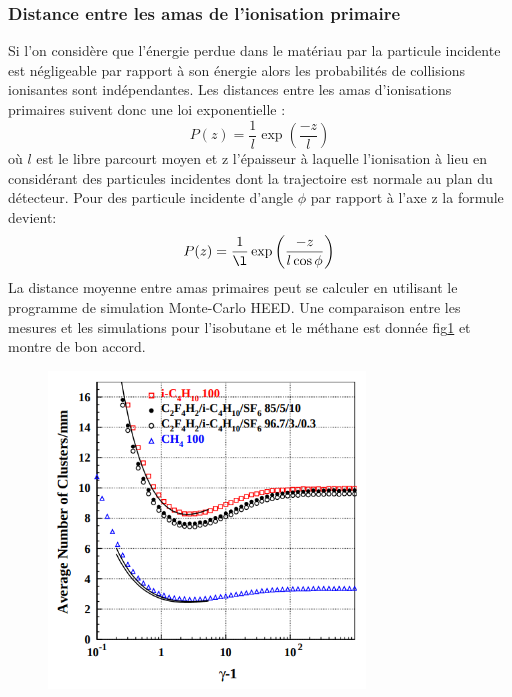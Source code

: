 \subsubsection{Distance entre les amas de l'ionisation primaire}
Si l'on considère que l'énergie perdue dans le matériau par la particule incidente est négligeable par rapport à son énergie alors les probabilités de collisions ionisantes sont indépendantes. Les distances entre les amas d'ionisations primaires suivent donc une loi exponentielle :
\begin{equation}
P(z)=\frac{1}{l}\exp\left(\frac{-z}{l}\right)
\end{equation} 
où $l$ est le libre parcourt moyen et z l'épaisseur à laquelle l'ionisation à lieu en considérant des particules incidentes dont la trajectoire est normale au plan du détecteur. Pour des particule incidente d'angle $\phi$ par rapport à l'axe z la formule devient:
\begin{equation}
P(z)=\frac{1}{\l}\exp\left(\frac{-z}{l\cos\phi}\right)
\end{equation}
La distance moyenne entre amas primaires peut se calculer en utilisant le programme de simulation Monte-Carlo HEED\cite{HEED}. Une comparaison entre les mesures et les simulations pour l'isobutane et le méthane est donnée fig\ref{lambda} et montre de bon accord\cite{2004NIMPA}.  
\begin{figure}[h!]
	\centering
	\includegraphics[width=0.75\textwidth]{RPC/lambda.png}
	\label{lambda}
\end{figure}

